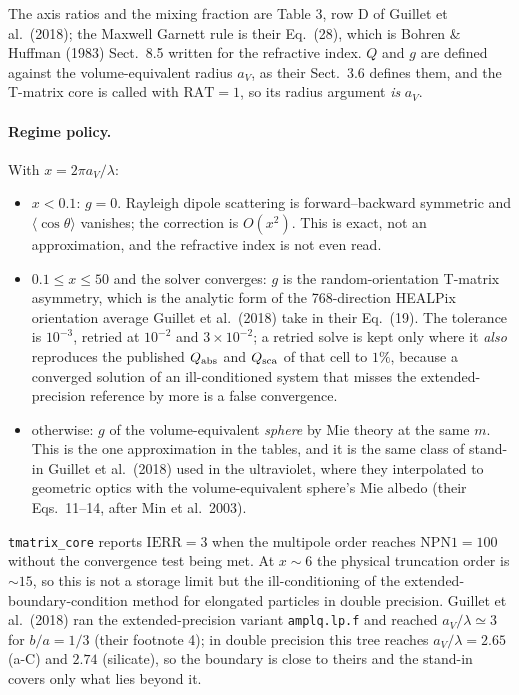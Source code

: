 \documentclass{my_memo}
\newcommand{\code}[1]{\texttt{#1}}
\begin{document}
\noindent The axis ratios and the mixing fraction are Table 3, row D of
Guillet et al.\ (2018); the Maxwell Garnett rule is their Eq.~(28), which is
Bohren \& Huffman (1983) Sect.~8.5 written for the refractive index. $Q$ and
$g$ are defined against the volume-equivalent radius $a_V$, as their Sect.~3.6
defines them, and the T-matrix core is called with $\mathrm{RAT} = 1$, so its
radius argument \emph{is} $a_V$.

\paragraph{Regime policy.} With $x = 2\pi a_V/\lambda$:
\begin{itemize}
\item $x < 0.1$: $g = 0$. Rayleigh dipole scattering is forward--backward
      symmetric and $\langle\cos\theta\rangle$ vanishes; the correction is
      $O(x^2)$. This is exact, not an approximation, and the refractive index
      is not even read.
\item $0.1 \le x \le 50$ and the solver converges: $g$ is the
      random-orientation T-matrix asymmetry, which is the analytic form of the
      768-direction HEALPix orientation average Guillet et al.\ (2018) take in
      their Eq.~(19). The tolerance is $10^{-3}$, retried at $10^{-2}$ and
      $3\times10^{-2}$; a retried solve is kept only where it \emph{also}
      reproduces the published $Q_{\rm abs}$ and $Q_{\rm sca}$ of that cell to
      $1\%$, because a converged solution of an ill-conditioned system that
      misses the extended-precision reference by more is a false convergence.
\item otherwise: $g$ of the volume-equivalent \emph{sphere} by Mie theory at
      the same $m$. This is the one approximation in the tables, and it is the
      same class of stand-in Guillet et al.\ (2018) used in the ultraviolet, where
      they interpolated to geometric optics with the volume-equivalent sphere's
      Mie albedo (their Eqs.~11--14, after Min et al.\ 2003).
\end{itemize}

\noindent \code{tmatrix\_core} reports $\mathrm{IERR} = 3$ when the multipole
order reaches $\mathrm{NPN1} = 100$ without the convergence test being met. At
$x \sim 6$ the physical truncation order is $\sim 15$, so this is not a storage
limit but the ill-conditioning of the extended-boundary-condition method for
elongated particles in double precision. Guillet et al.\ (2018) ran the
extended-precision variant \code{amplq.lp.f} and reached $a_V/\lambda \simeq 3$
for $b/a = 1/3$ (their footnote 4); in double precision this tree reaches
$a_V/\lambda = 2.65$ (a-C) and $2.74$ (silicate), so the boundary is close to
theirs and the stand-in covers only what lies beyond it.
\end{document}
